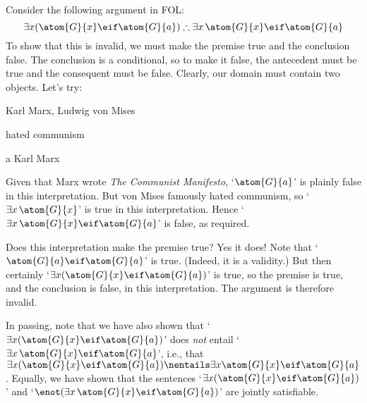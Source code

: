 Consider the following argument in FOL:
$$\exists x(\atom{G}{x} \eif \atom{G}{a}) \therefore \exists x\, \atom{G}{x} \eif \atom{G}{a}$$
To show that this is invalid, we must make the premise true and the conclusion false. The conclusion is a conditional, so to make it false, the antecedent must be true and the consequent must be false. Clearly, our domain must contain two objects. Let's try:
	\begin{ekey}
		\item[\text{domain}] Karl Marx, Ludwig von Mises
		\item[\atom{G}{x}]  hated communism
		\item[a] Karl Marx
	\end{ekey}
Given that Marx wrote \emph{The Communist Manifesto}, `$\atom{G}{a}$' is plainly false in this interpretation. But von Mises famously hated communism, so `$\exists x\, \atom{G}{x}$' is true in this interpretation. Hence `$\exists x\, \atom{G}{x} \eif \atom{G}{a}$' is false, as required.

Does this interpretation make the premise true? Yes it does! Note that `$\atom{G}{a} \eif \atom{G}{a}$' is true. (Indeed, it is a validity.) But then certainly `$\exists x (\atom{G}{x} \eif \atom{G}{a})$' is true, so the premise is true, and the conclusion is false, in this interpretation. The argument is therefore invalid.

In passing, note that we have also shown that `$\exists x(\atom{G}{x} \eif \atom{G}{a})$' does \emph{not} entail `$\exists x\, \atom{G}{x} \eif \atom{G}{a}$', i.e., that $\exists x (\atom{G}{x} \eif \atom{G}{a}) \nentails \exists x \atom{G}{x} \eif \atom{G}{a}$. Equally, we have shown that the sentences `$\exists x (\atom{G}{x} \eif \atom{G}{a})$' and `$\enot (\exists x\, \atom{G}{x} \eif \atom{G}{a})$' are jointly satisfiable.

